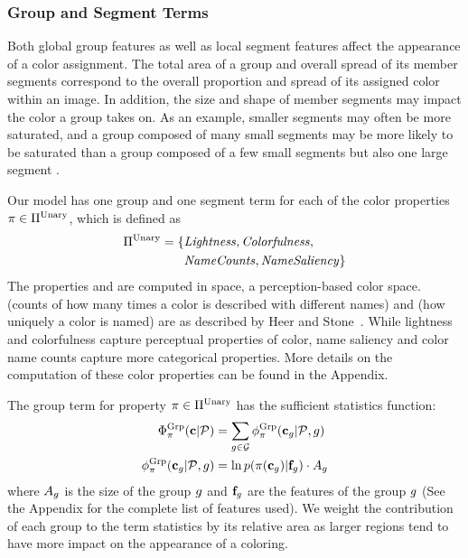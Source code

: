 \subsubsection{Group and Segment Terms}
\label{sec:groupAndSegTerms}

Both global group features as well as local segment features affect the appearance of a color assignment. The total area of a group and overall spread of its member segments correspond to the overall proportion and spread of its assigned color within an image. In addition, the size and shape of member segments may impact the color a group takes on. As an example, smaller segments may often be more saturated, and a group composed of many small segments may be more likely to be saturated than a group composed of a few small segments but also one large segment .

Our model has one group and one segment term for each of the color properties $ \pi \in \Pi^{\textrm{Unary}}$, which is defined as
\begin{align*}
\Pi^{\textrm{Unary}} = \{ &\text{\emph{Lightness}}, \text{\emph{Colorfulness}}, \\
                 &\text{\emph{NameCounts}}, \text{\emph{NameSaliency}} \}
\end{align*}
The properties  and  are computed in \lab space, a perception-based color space.  (counts of how many times a color is described with different names) and  (how uniquely a color is named) are as described by Heer and Stone~. While lightness and colorfulness capture perceptual properties of color, name saliency and color name counts capture more categorical properties. More details on the computation of these color properties can be found in the Appendix.

The group term for property $\pi \in \Pi^{\textrm{Unary}}$ has the sufficient statistics function:
\begin{align*}
 \Phi^{\textrm{Grp}}_\pi(\mathbf{c}|\mathcal{P}) &= \sum_{g \in \mathcal{G}} \phi^{\textrm{Grp}}_\pi(\mathbf{c}_g | \mathcal{P}, g) \\
 \phi^{\textrm{Grp}}_\pi(\mathbf{c}_g | \mathcal{P}, g) &=  \ln p( \pi( \mathbf{c}_g ) | \mathbf{f}_g ) \cdot A_g
\end{align*}
where $A_g$ is the size of the group $g$ and $\mathbf{f}_g$ are the features of the group $g$ (See the Appendix for the complete list of features used). We weight the contribution of each group to the term statistics by its relative area as larger regions tend to have more impact on the appearance of a coloring.

